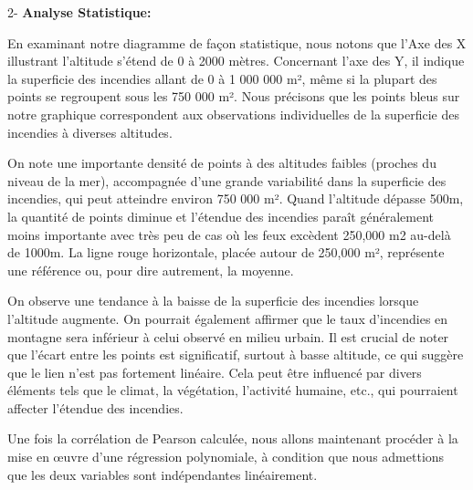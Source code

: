 \documentclass[
]{article}
\begin{document}
2- \textbf{Analyse Statistique:}

En examinant notre diagramme de façon statistique, nous notons que l'Axe
des X illustrant l'altitude s'étend de 0 à 2000 mètres. Concernant l'axe
des Y, il indique la superficie des incendies allant de 0 à 1 000 000
m², même si la plupart des points se regroupent sous les 750 000 m².
Nous précisons que les points bleus sur notre graphique correspondent
aux observations individuelles de la superficie des incendies à diverses
altitudes.

On note une importante densité de points à des altitudes faibles
(proches du niveau de la mer), accompagnée d'une grande variabilité dans
la superficie des incendies, qui peut atteindre environ 750 000 m².
Quand l'altitude dépasse 500m, la quantité de points diminue et
l'étendue des incendies paraît généralement moins importante avec très
peu de cas où les feux excèdent 250,000 m2 au-delà de 1000m. La ligne
rouge horizontale, placée autour de 250,000 m², représente une référence
ou, pour dire autrement, la moyenne.

On observe une tendance à la baisse de la superficie des incendies
lorsque l'altitude augmente. On pourrait également affirmer que le taux
d'incendies en montagne sera inférieur à celui observé en milieu urbain.
Il est crucial de noter que l'écart entre les points est significatif,
surtout à basse altitude, ce qui suggère que le lien n'est pas fortement
linéaire. Cela peut être influencé par divers éléments tels que le
climat, la végétation, l'activité humaine, etc., qui pourraient affecter
l'étendue des incendies.

Une fois la corrélation de Pearson calculée, nous allons maintenant
procéder à la mise en œuvre d'une régression polynomiale, à condition
que nous admettions que les deux variables sont indépendantes
linéairement.
\end{document}
